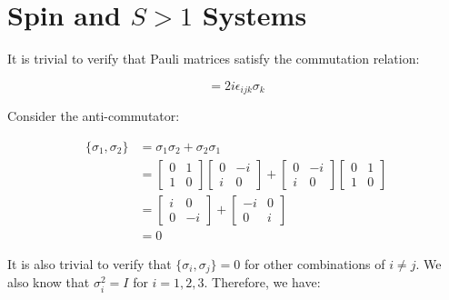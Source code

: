 \documentclass[12pt]{article}
\begin{document}



\pagebreak
\section*{Spin and $S > 1$ Systems}


It is trivial to verify that Pauli matrices satisfy the commutation relation:

\begin{equation}
    [\sigma_{i}, \sigma_{j}] = 2i\epsilon_{ijk} \sigma_{k}
\end{equation}

Consider the anti-commutator:

\begin{equation}
\begin{split}
    \{ \sigma_{1}, \sigma_{2} \} &= \sigma_{1}\sigma_{2} + \sigma_{2}\sigma_{1} \\
    &=
    \begin{bmatrix}
        0 & 1 \\
        1 & 0
    \end{bmatrix}
    \begin{bmatrix}
        0 & -i \\
        i & 0
    \end{bmatrix}
    +
    \begin{bmatrix}
        0 & -i \\
        i & 0
    \end{bmatrix}
    \begin{bmatrix}
        0 & 1 \\
        1 & 0
    \end{bmatrix} \\
    &=
    \begin{bmatrix}
        i & 0 \\
        0 & -i
    \end{bmatrix}
    +
    \begin{bmatrix}
        -i & 0 \\
        0 & i
    \end{bmatrix} \\
    &= 0
\end{split}
\end{equation}

It is also trivial to verify that $\{ \sigma_{i}, \sigma_{j} \} = 0$ for other combinations of $i \neq j$. We also know that $\sigma_{i}^{2} = I$ for $i = 1, 2, 3$. Therefore, we have:
\end{document}
